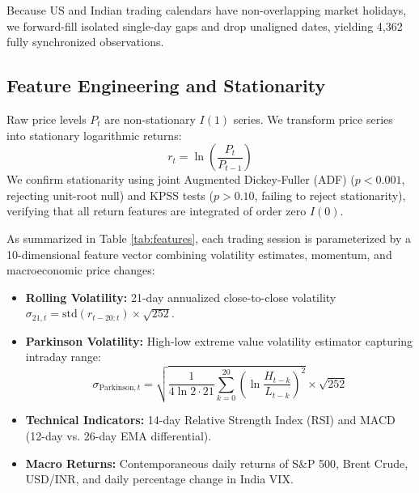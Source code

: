 \documentclass[10pt,twocolumn,letterpaper]{article}
\begin{document}
Because US and Indian trading calendars have non-overlapping market holidays, we forward-fill isolated single-day gaps and drop unaligned dates, yielding 4,362 fully synchronized observations.

\subsection{Feature Engineering and Stationarity}
Raw price levels $P_t$ are non-stationary $I(1)$ series. We transform price series into stationary logarithmic returns:
\begin{equation}
    r_t = \ln\left(\frac{P_t}{P_{t-1}}\right)
\end{equation}
We confirm stationarity using joint Augmented Dickey-Fuller (ADF) ($p < 0.001$, rejecting unit-root null) and KPSS tests ($p > 0.10$, failing to reject stationarity), verifying that all return features are integrated of order zero $I(0)$.

As summarized in Table \ref{tab:features}, each trading session is parameterized by a 10-dimensional feature vector combining volatility estimates, momentum, and macroeconomic price changes:
\begin{itemize}[leftmargin=*]
    \item \textbf{Rolling Volatility:} 21-day annualized close-to-close volatility $\sigma_{21, t} = \text{std}(r_{t-20:t}) \times \sqrt{252}$.
    \item \textbf{Parkinson Volatility:} High-low extreme value volatility estimator capturing intraday range:
    \begin{equation}
        \sigma_{\text{Parkinson}, t} = \sqrt{\frac{1}{4 \ln 2 \cdot 21}\sum_{k=0}^{20}\left(\ln\frac{H_{t-k}}{L_{t-k}}\right)^2} \times \sqrt{252}
    \end{equation}
    \item \textbf{Technical Indicators:} 14-day Relative Strength Index (RSI) and MACD (12-day vs. 26-day EMA differential).
    \item \textbf{Macro Returns:} Contemporaneous daily returns of S\&P 500, Brent Crude, USD/INR, and daily percentage change in India VIX.
\end{itemize}
\end{document}
